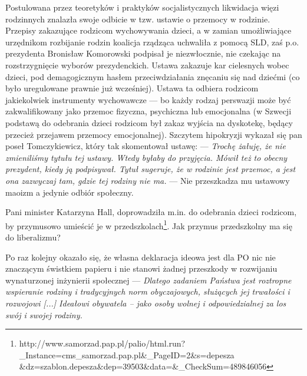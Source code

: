 \documentclass[10pt]{article}
\begin{document}
Postulowana przez teoretyków i praktyków socjalistycznych likwidacja więzi rodzinnych znalazła swoje odbicie w tzw. ustawie o przemocy w rodzinie. Przepisy zakazujące rodzicom wychowywania dzieci, a w zamian umożliwiające urzędnikom rozbijanie rodzin koalicja rządząca uchwaliła z pomocą SLD, zaś p.o. prezydenta Bronisław Komorowski podpisał je niezwłocznie, nie czekając na rozstrzygnięcie wyborów prezydenckich. Ustawa zakazuje kar cielesnych wobec dzieci, pod demagogicznym hasłem przeciwdziałania znęcaniu się nad dziećmi (co było uregulowane prawnie już wcześniej). Ustawa ta odbiera rodzicom jakiekolwiek instrumenty wychowawcze --- bo każdy rodzaj perswazji może być zakwalifikowany jako przemoc fizyczna, psychiczna lub emocjonalna (w Szwecji podstawą do odebrania dzieci rodzicom był zakaz wyjścia na dyskotekę, będący przecież przejawem przemocy emocjonalnej). Szczytem hipokryzji wykazał się pan poseł Tomczykiewicz, który tak skomentował ustawę:
--- {\em Trochę żałuję, że nie zmieniliśmy tytułu tej ustawy. Wtedy byłaby do przyjęcia. Mówił też to obecny prezydent, kiedy ją podpisywał. Tytuł sugeruje, że w rodzinie jest przemoc, a jest ona zazwyczaj tam, gdzie tej rodziny nie ma.} --- Nie przeszkadza mu ustawowy maoizm a jedynie odbiór społeczny. 

Pani minister Katarzyna Hall, doprowadziła m.in. do odebrania dzieci rodzicom, by przymusowo umieścić je w przedszkolach\footnote{http://www.samorzad.pap.pl/palio/html.run?\_Instance=cms\_samorzad.pap.pl\&\_PageID=2\&s=depesza\\\&dz=szablon.depesza\&dep=39503\&data=\&\_CheckSum=489846056}. Jak przymus przedszkolny ma się do liberalizmu?

Po raz kolejny okazało się, że własna deklaracja ideowa jest dla PO nic nie znaczącym świstkiem papieru i nie stanowi żadnej przeszkody w rozwijaniu wynaturzonej inżynierii społecznej --- {\em Dlatego zadaniem Państwa jest roztropne wspieranie rodziny i tradycyjnych norm obyczajowych, służących jej trwałości i rozwojowi [...] Ideałowi obywatela – jako osoby wolnej i odpowiedzialnej za los swój i swojej rodziny.}
\end{document}
